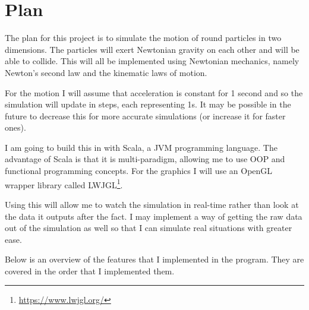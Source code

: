 \section{Plan}
	The plan for this project is to simulate the motion of round particles in two dimensions. The particles will exert Newtonian gravity on each other and will be able to collide. This will all be implemented using Newtonian mechanics, namely Newton's second law and the kinematic laws of motion.
	
	For the motion I will assume that acceleration is constant for 1 second and so the simulation will update in steps, each representing 1s. It may be possible in the future to decrease this for more accurate simulations (or increase it for faster ones).
	
	I am going to build this in with Scala, a JVM programming language. The advantage of Scala is that it is multi-paradigm, allowing me to use OOP and functional programming concepts. For the graphics I will use an OpenGL wrapper library called LWJGL\footnote{\url{https://www.lwjgl.org/}}.
	
	Using this will allow me to watch the simulation in real-time rather than look at the data it outputs after the fact. I may implement a way of getting the raw data out of the simulation as well so that I can simulate real situations with greater ease.
	
	Below is an overview of the features that I implemented in the program. They are covered in the order that I implemented them.